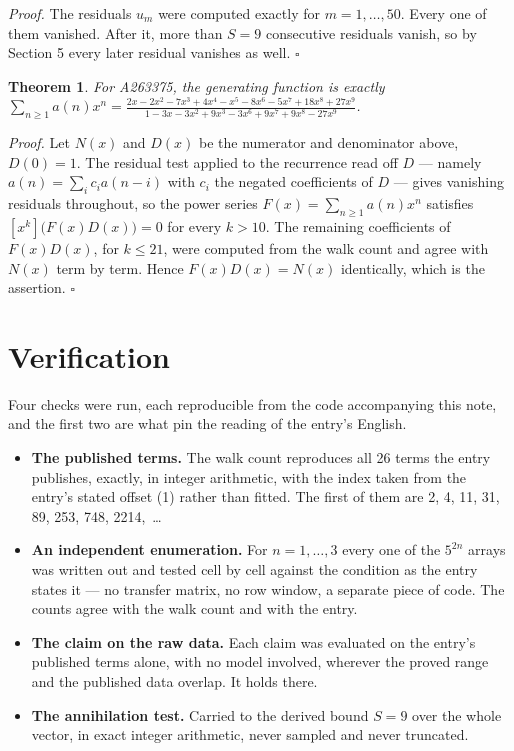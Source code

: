 \documentclass[11pt]{article}
\newtheorem{theorem}{Theorem}
\theoremstyle{definition}
\begin{document}
{\itshape Proof.} The residuals $u_m$ were computed exactly for $m = 1,\dots,50$. Every one of them vanished. After it, more than $S = 9$ consecutive residuals vanish, so by Section 5 every later residual vanishes as well. $\square$

\begin{theorem} For A263375, the generating function is exactly $\sum_{n\ge 1} a(n)x^n = \frac{2x - 2x^{2} - 7x^{3} + 4x^{4} - x^{5} - 8x^{6} - 5x^{7} + 18x^{8} + 27x^{9}}{1 - 3x - 3x^{2} + 9x^{3} - 3x^{6} + 9x^{7} + 9x^{8} - 27x^{9}}$.\end{theorem}

{\itshape Proof.} Let $N(x)$ and $D(x)$ be the numerator and denominator above, $D(0)=1$. The residual test applied to the recurrence read off $D$ --- namely $a(n) = \sum_i c_i a(n-i)$ with $c_i$ the negated coefficients of $D$ --- gives vanishing residuals throughout, so the power series $F(x)=\sum_{n\ge 1}a(n)x^n$ satisfies $[x^k]\bigl(F(x)D(x)\bigr) = 0$ for every $k > 10$. The remaining coefficients of $F(x)D(x)$, for $k \le 21$, were computed from the walk count and agree with $N(x)$ term by term. Hence $F(x)D(x) = N(x)$ identically, which is the assertion. $\square$

\section{Verification}

Four checks were run, each reproducible from the code accompanying this note, and the first two are what pin the reading of the entry's English.

\begin{itemize}

\item {\bfseries The published terms.} The walk count reproduces all 26 terms the entry publishes, exactly, in integer arithmetic, with the index taken from the entry's stated offset (1) rather than fitted. The first of them are 2, 4, 11, 31, 89, 253, 748, 2214,~\dots

\item {\bfseries An independent enumeration.} For $n = 1,\dots,3$ every one of the $5^{2n}$ arrays was written out and tested cell by cell against the condition as the entry states it --- no transfer matrix, no row window, a separate piece of code. The counts agree with the walk count and with the entry.

\item {\bfseries The claim on the raw data.} Each claim was evaluated on the entry's published terms alone, with no model involved, wherever the proved range and the published data overlap. It holds there.

\item {\bfseries The annihilation test.} Carried to the derived bound $S = 9$ over the whole vector, in exact integer arithmetic, never sampled and never truncated.

\end{itemize}
\end{document}
